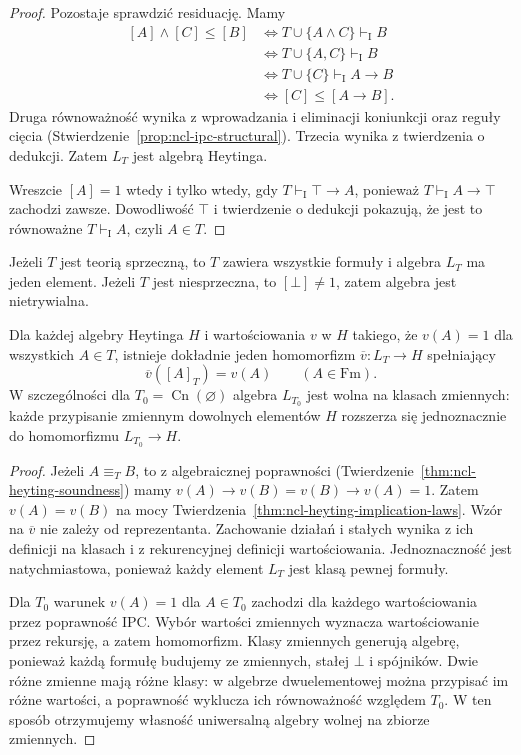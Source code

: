\begin{proof}
Pozostaje sprawdzić residuację. Mamy
\[
\begin{aligned}
 [A]\wedge[C]\leq[B]
 &\iff T\cup\{A\wedge C\}\vdash_{\mathrm I}B\\
 &\iff T\cup\{A,C\}\vdash_{\mathrm I}B\\
 &\iff T\cup\{C\}\vdash_{\mathrm I}A\to B\\
 &\iff [C]\leq[A\to B].
\end{aligned}
\]
Druga równoważność wynika z wprowadzania
i eliminacji koniunkcji oraz reguły cięcia
(Stwierdzenie~\ref{prop:ncl-ipc-structural}).
Trzecia wynika z twierdzenia o dedukcji.
Zatem $L_T$ jest algebrą Heytinga.

Wreszcie $[A]=1$ wtedy i tylko wtedy, gdy
$T\vdash_{\mathrm I}\top\to A$, ponieważ
$T\vdash_{\mathrm I}A\to\top$ zachodzi zawsze.
Dowodliwość $\top$ i twierdzenie o dedukcji
pokazują, że jest to równoważne
$T\vdash_{\mathrm I} A$, czyli $A\in T$.
\end{proof}
Jeżeli $T$ jest teorią sprzeczną, to $T$ zawiera
wszystkie formuły i algebra $L_T$ ma jeden element.
Jeżeli $T$ jest niesprzeczna, to $[\bot]\ne1$,
zatem algebra jest nietrywialna.

\begin{twierdzenie}
\label{thm:ncl-heyting-lindenbaum-universal}
Dla każdej algebry Heytinga $H$ i wartościowania
$v$ w $H$ takiego, że $v(A)=1$ dla wszystkich
$A\in T$, istnieje dokładnie jeden homomorfizm
$\overline v:L_T\to H$ spełniający
\[
 \overline v([A]_T)=v(A)
 \qquad(A\in\mathrm{Fm}).
\]
W szczególności dla $T_0=\operatorname{Cn}(\varnothing)$
algebra $L_{T_0}$ jest wolna na klasach zmiennych:
każde przypisanie zmiennym dowolnych elementów $H$
rozszerza się jednoznacznie do homomorfizmu
$L_{T_0}\to H$.
\end{twierdzenie}
\begin{proof}
Jeżeli $A\equiv_T B$, to z algebraicznej poprawności
(Twierdzenie~\ref{thm:ncl-heyting-soundness}) mamy
$v(A)\to v(B)=v(B)\to v(A)=1$.
Zatem $v(A)=v(B)$ na mocy
Twierdzenia~\ref{thm:ncl-heyting-implication-laws}.
Wzór na $\overline v$ nie zależy od reprezentanta.
Zachowanie działań i stałych wynika z ich definicji
na klasach i z rekurencyjnej definicji wartościowania.
Jednoznaczność jest natychmiastowa, ponieważ
każdy element $L_T$ jest klasą pewnej formuły.

Dla $T_0$ warunek $v(A)=1$ dla $A\in T_0$
zachodzi dla każdego wartościowania przez
poprawność IPC. Wybór wartości zmiennych
wyznacza wartościowanie przez rekursję,
a zatem homomorfizm. Klasy zmiennych generują
algebrę, ponieważ każdą formułę budujemy
ze zmiennych, stałej $\bot$ i spójników.
Dwie różne zmienne mają różne klasy: w algebrze
dwuelementowej można przypisać im różne wartości,
a poprawność wyklucza ich równoważność względem $T_0$.
W ten sposób otrzymujemy własność uniwersalną
algebry wolnej na zbiorze zmiennych.
\end{proof}

